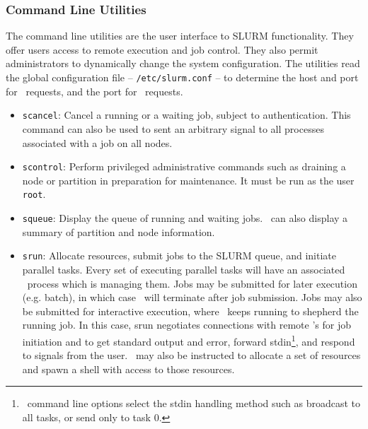 \begin{itemize}

\end{itemize}

\subsubsection{Command Line Utilities}

The command line utilities are the user interface to SLURM functionality.
They offer users access to remote execution and job control. They also 
permit administrators to dynamically change the system configuration. The 
utilities read the global configuration file -- {\tt /etc/slurm.conf} --
to determine the host and port for \slurmctld\ requests, and the port
for \slurmd\ requests. 

\begin{itemize}
\item {\tt scancel}: Cancel a running or a waiting job, subject to
authentication. This command can also be used to sent an arbitrary 
signal to all processes associated with a job on all nodes.

\item {\tt scontrol}: Perform privileged administrative commands
such as draining a node or partition in preparation for maintenance. 
It must be run as the user {\tt root}.

\item {\tt squeue}: Display the queue of running and waiting jobs. 
\squeue\ can also display a summary of partition and node information.

\item {\tt srun}: Allocate resources, submit jobs to the SLURM queue,
and initiate parallel tasks. Every set of executing parallel tasks will
have an associated \srun\ process which is managing them. 
Jobs may be submitted for later execution (e.g. batch), in which case 
\srun\ will terminate after job submission. 
Jobs may also be submitted for interactive execution, where \srun\ keeps 
running to shepherd the running job. In this case, 
srun negotiates connections with remote \slurmd 's for job initiation and to
get standard output and error, forward stdin\footnote{\srun\ command
line options select the stdin handling method such as broadcast to all
tasks, or send only to task 0.}, and respond to signals from the user.
\srun\ may also be instructed to allocate a set of resources and
spawn a shell with access to those resources.

\end{itemize}


